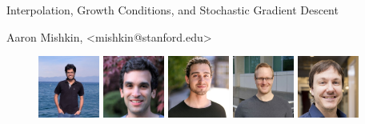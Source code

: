 \documentclass[mathserif,notheorems, hyperref={colorlinks, citecolor=blue, urlcolor=blue, linkcolor=blue}]{beamer}
\title{}
\author{}
\institute{}
\date{}
\def\\{}%
\def\texttt#1{<#1>}%
\begin{document}
        \begin{frame}
        \vspace{1em}
        \begin{center}
            {\Large Interpolation, Growth Conditions, and Stochastic Gradient Descent  \vspace{1em}} %

            {\large Aaron Mishkin, \\ \texttt{mishkin@stanford.edu} } %
        \end{center}

        \vspace{1ex}

       \begin{figure}
            \centering
            \includegraphics[width=0.18\textwidth]{collaborators/sharan}
            \includegraphics[width=0.18\textwidth]{collaborators/issam}
            \includegraphics[width=0.18\textwidth]{collaborators/gauthier}
            \includegraphics[width=0.18\textwidth]{collaborators/mark}
            \includegraphics[width=0.18\textwidth]{collaborators/simon}


\end{figure}
\end{frame}
\end{document}
